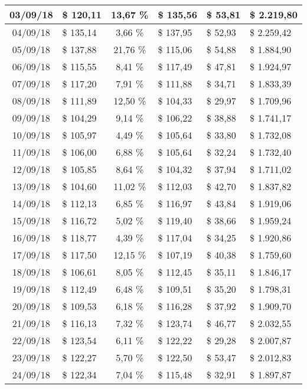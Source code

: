 \begin{center}
\begin{small}
\begin{longtable}{|c|l|c|l|l|l|}
03/09/18 & \$ 120,11 & 13,67 \% & \$ 135,56 & \$ 53,81 & \$ 2.219,80 \\ \hline
04/09/18 & \$ 135,14 & 3,66 \% & \$ 137,95 & \$ 52,93 & \$ 2.259,42 \\ \hline
05/09/18 & \$ 137,88 & 21,76 \% & \$ 115,06 & \$ 54,88 & \$ 1.884,90 \\ \hline
06/09/18 & \$ 115,55 & 8,41 \% & \$ 117,49 & \$ 47,81 & \$ 1.924,97 \\ \hline
07/09/18 & \$ 117,20 & 7,91 \% & \$ 111,88 & \$ 34,71 & \$ 1.833,39 \\ \hline
08/09/18 & \$ 111,89 & 12,50 \% & \$ 104,33 & \$ 29,97 & \$ 1.709,96 \\ \hline
09/09/18 & \$ 104,29 & 9,14 \% & \$ 106,22 & \$ 38,88 & \$ 1.741,17 \\ \hline
10/09/18 & \$ 105,97 & 4,49 \% & \$ 105,64 & \$ 33,80 & \$ 1.732,08 \\ \hline
11/09/18 & \$ 106,00 & 6,88 \% & \$ 105,64 & \$ 32,24 & \$ 1.732,40 \\ \hline
12/09/18 & \$ 105,85 & 8,64 \% & \$ 104,32 & \$ 37,94 & \$ 1.711,02 \\ \hline
13/09/18 & \$ 104,60 & 11,02 \% & \$ 112,03 & \$ 42,70 & \$ 1.837,82 \\ \hline
14/09/18 & \$ 112,13 & 6,85 \% & \$ 116,97 & \$ 43,84 & \$ 1.919,06 \\ \hline
15/09/18 & \$ 116,72 & 5,02 \% & \$ 119,40 & \$ 38,66 & \$ 1.959,24 \\ \hline
16/09/18 & \$ 118,77 & 4,39 \% & \$ 117,04 & \$ 34,25 & \$ 1.920,86 \\ \hline
17/09/18 & \$ 117,50 & 12,15 \% & \$ 107,19 & \$ 40,38 & \$ 1.759,60 \\ \hline
18/09/18 & \$ 106,61 & 8,05 \% & \$ 112,45 & \$ 35,11 & \$ 1.846,17 \\ \hline
19/09/18 & \$ 112,49 & 6,48 \% & \$ 109,51 & \$ 35,20 & \$ 1.798,31 \\ \hline
20/09/18 & \$ 109,53 & 6,18 \% & \$ 116,28 & \$ 37,92 & \$ 1.909,70 \\ \hline
21/09/18 & \$ 116,13 & 7,32 \% & \$ 123,74 & \$ 46,77 & \$ 2.032,55 \\ \hline
22/09/18 & \$ 123,54 & 6,11 \% & \$ 122,22 & \$ 29,28 & \$ 2.007,87 \\ \hline
23/09/18 & \$ 122,27 & 5,70 \% & \$ 122,50 & \$ 53,47 & \$ 2.012,83 \\ \hline
24/09/18 & \$ 122,34 & 7,04 \% & \$ 115,48 & \$ 32,91 & \$ 1.897,87 \\ \hline

\end{longtable}
\end{small}
\end{center}
